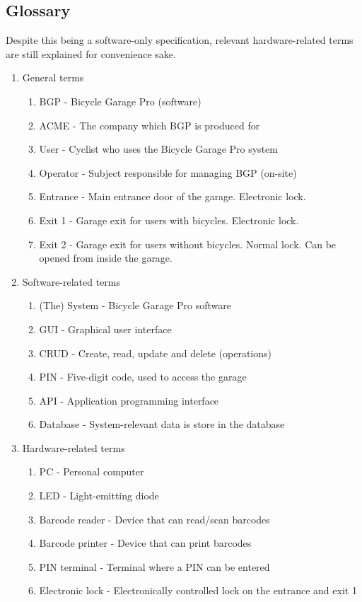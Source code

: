 \documentclass[12pt,titlepage,bibliography=totoc]{article}
\begin{document}
\subsection{Glossary}
Despite this being a software-only specification, relevant hardware-related terms are still explained for convenience sake.
\begin{enumerate}
	\item General terms
	\begin{enumerate}
		\item BGP - Bicycle Garage Pro (software)
		\item ACME - The company which BGP is produced for
		\item User - Cyclist who uses the Bicycle Garage Pro system
		\item Operator - Subject responsible for managing BGP (on-site)
		\item Entrance - Main entrance door of the garage. Electronic lock.
		\item Exit 1 - Garage exit for users with bicycles. Electronic lock.
		\item Exit 2 - Garage exit for users without bicycles. Normal lock. Can be opened from inside the garage.
	\end{enumerate}

	\item Software-related terms
	\begin{enumerate}
		\item (The) System - Bicycle Garage Pro software
		\item GUI - Graphical user interface
		\item CRUD - Create, read, update and delete (operations)
		\item PIN - Five-digit code, used to access the garage
		\item API - Application programming interface
		\item Database - System-relevant data is store in the database
	\end{enumerate}

	\item Hardware-related terms
	\begin{enumerate}
		\item PC - Personal computer
		\item LED - Light-emitting diode
		\item Barcode reader - Device that can read/scan barcodes
		\item Barcode printer - Device that can print barcodes
		\item PIN terminal - Terminal where a PIN can be entered
		\item Electronic lock - Electronically controlled lock on the entrance and exit 1
	\end{enumerate}
\end{enumerate}
\end{document}
